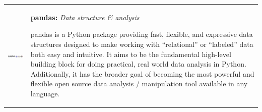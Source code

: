 \columnbreak

    \begin{center}
    \begin{tabularx}{\textwidth}{rX}
        \begin{minipage}{0.25\columnwidth}
            \begin{center}
            \includegraphics[width=6cm]{./images/pandas.png}
            \end{center}
        \end{minipage}
        &
        \begin{minipage}{0.7\columnwidth}
            \textbf{pandas:} \textit{Data structure \& analysis}
            \vspace{0.5ex}

            \footnotesize{pandas is a Python package providing fast, flexible, and expressive data structures designed to make working with “relational” or “labeled” data both easy and intuitive. It aims to be the fundamental high-level building block for doing practical, real world data analysis in Python. Additionally, it has the broader goal of becoming the most powerful and flexible open source data analysis / manipulation tool available in any language.}
        \end{minipage}
    \end{tabularx}
    \end{center}


\vspace{1ex}
\noindent\hrulefill
\vspace{1ex}

